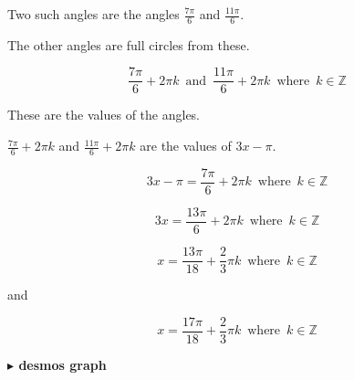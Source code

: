 \documentclass{ximera}
\begin{document}
\begin{example}
\begin{image}
\end{image}










Two such angles are the angles $\frac{7\pi}{6}$ and $\frac{11\pi}{6}$.


The other angles are full circles from these.

\[
\frac{7\pi}{6} + 2 \pi k \, \text{ and } \, \frac{11\pi}{6} + 2 \pi k \, \text{ where } \, k \in \mathbb{Z}
\]


These are the values of the angles.

$\frac{7\pi}{6} + 2 \pi k$ and $\frac{11\pi}{6} + 2 \pi k$ are the values of $3x - \pi$.



\[ 
3 x - \pi = \frac{7\pi}{6} + 2 \pi k \, \text{ where } \, k \in \mathbb{Z}
\]


\[ 
3 x = \frac{13\pi}{6} + 2 \pi k  \, \text{ where } \, k \in \mathbb{Z}
\]


\[ 
x = \frac{13\pi}{18} + \frac{2}{3} \pi k  \, \text{ where } \, k \in \mathbb{Z}
\]


and



\[ 
x = \frac{17\pi}{18} + \frac{2}{3} \pi k  \, \text{ where } \, k \in \mathbb{Z}
\]











\textbf{\textcolor{blue!55!black}{$\blacktriangleright$ desmos graph}} 
\begin{center}
\end{center}









\end{example}
\end{document}
